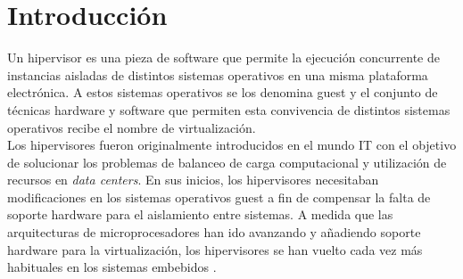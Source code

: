 \chapter{Introducción}
\label{ch:introduccion:primera}
Un hipervisor es una pieza de software que permite la ejecución concurrente de instancias aisladas de distintos sistemas operativos en una misma plataforma electrónica. A estos sistemas operativos se los denomina guest y el conjunto de técnicas hardware y software que permiten esta convivencia de distintos sistemas operativos recibe el nombre de virtualización.\\
Los hipervisores fueron originalmente introducidos en el mundo IT con el objetivo de solucionar los problemas de
balanceo de carga computacional y utilización de recursos en \textit{data centers}. En sus inicios, los hipervisores necesitaban modificaciones en los sistemas operativos guest a fin de compensar la falta de soporte hardware para el aislamiento
entre sistemas. A medida que las arquitecturas de microprocesadores han ido avanzando y añadiendo
soporte hardware para la virtualización, los hipervisores se han vuelto cada vez más habituales en los
sistemas embebidos \cite{EmbeddedWorld2018}.\\

